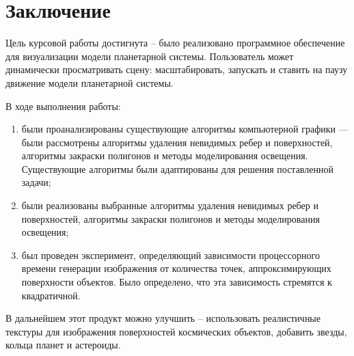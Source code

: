 \section*{\large Заключение}
    \par Цель курсовой работы достигнута -- было реализовано программное обеспечение для визуализации модели планетарной системы. Пользователь может динамически просматривать сцену: масштабировать, запускать и ставить на паузу движение модели планетарной системы.
	\par В ходе выполнения работы:
	\begin{enumerate}
		\item были проанализированы существующие алгоритмы компьютерной графики — были рассмотрены алгоритмы удаления невидимых ребер и поверхностей, алгоритмы закраски полигонов и методы моделирования освещения. Существующие алгоритмы были адаптированы для решения поставленной задачи;
		\item были реализованы выбранные алгоритмы удаления невидимых ребер и поверхностей, алгоритмы закраски полигонов и методы моделирования освещения;
		\item был проведен эксперимент, определяющий зависимости процессорного времени генерации изображения от количества точек, аппроксимирующих поверхности объектов. Было определено, что эта зависимость стремятся к квадратичной.
	\end{enumerate}
	\par В дальнейшем этот продукт можно улучшить -- использовать реалистичные текстуры для изображения поверхностей космических объектов, добавить звезды, кольца планет и астероиды.
\newpage
